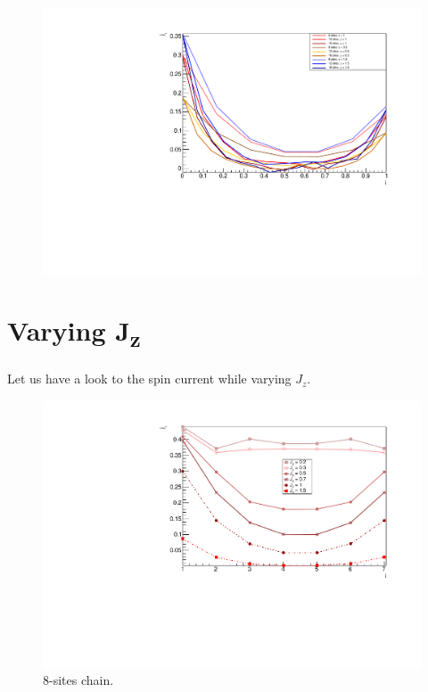 \begin{figure}[H]
    \centering
    \includegraphics[scale=0.7]{Figures/SpinCurrcomparisonVSsizeANDdissipationRate.pdf}
    \caption{}
    \label{fig:my_label}
\end{figure}

\section{Varying J\textsubscript{z}}

Let us have a look to the spin current while varying $J_z$.

\begin{figure}[H]
    \centering
    \includegraphics[scale=0.7]{Figures/8sites_spinCurrVSJz.pdf}
    \caption{8-sites chain.}
    \label{fig:my_label}
\end{figure}


